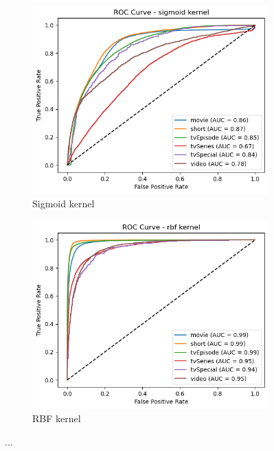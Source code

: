 \begin{figure}[h]
\begin{subfigure}[b]{0.24\textwidth}
    \end{subfigure}
    \begin{subfigure}[b]{0.24\textwidth}
        \centering
        \includegraphics[width=\textwidth]{plotsss/roc_sigmoid.png}
        \caption{Sigmoid kernel}
        \label{fig:roc_sigmoid}
    \end{subfigure}
    \begin{subfigure}[b]{0.24\textwidth}
        \centering
        \includegraphics[width=\textwidth]{plotsss/roc_rbf.png}
        \caption{RBF kernel}
        \label{fig:roc_rbf}
    \end{subfigure}
    \caption{...}  
    \label{fig:roc_four}
\end{figure}

